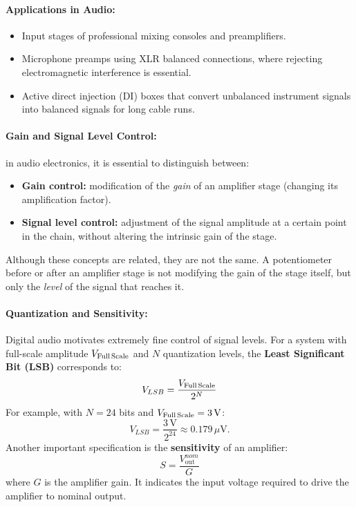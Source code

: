 \paragraph{Applications in Audio:}
\begin{itemize}
  \item Input stages of professional mixing consoles and preamplifiers.
  \item Microphone preamps using XLR balanced connections, where rejecting electromagnetic interference is essential.
  \item Active direct injection (DI) boxes that convert unbalanced instrument signals into balanced signals for long cable runs.
\end{itemize}



\paragraph{Gain and Signal Level Control:} in audio electronics, it is essential to distinguish between:
\begin{itemize}
  \item \textbf{Gain control:} modification of the \emph{gain} of an amplifier stage (changing its amplification factor).
  \item \textbf{Signal level control:} adjustment of the signal amplitude at a certain point in the chain, without altering the intrinsic gain of the stage.
\end{itemize}

Although these concepts are related, they are not the same.  
A potentiometer before or after an amplifier stage is not modifying the gain of the stage itself, but only the \emph{level} of the signal that reaches it.

\paragraph{Quantization and Sensitivity: }
Digital audio motivates extremely fine control of signal levels.  
For a system with full-scale amplitude $V_\text{Full\,Scale}$ and $N$ quantization levels, the \textbf{Least Significant Bit (LSB)} corresponds to:
\[
V_{LSB} = \frac{V_\text{Full\,Scale}}{2^N}
\]
For example, with $N = 24$ bits and $V_\text{Full\,Scale} = 3\,\text{V}$:
\[
V_{LSB} = \frac{3\,\text{V}}{2^{24}} \approx 0.179\,\mu\text{V}.
\]
Another important specification is the \textbf{sensitivity} of an amplifier:
\[
S = \frac{V_\text{out}^{nom}}{G}
\]
where $G$ is the amplifier gain.  
It indicates the input voltage required to drive the amplifier to nominal output.

